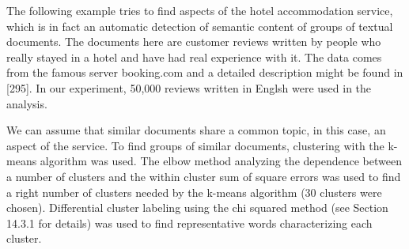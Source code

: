 \documentclass[11pt,openany,executivepaper]{book}
\begin{document}
The following example tries to find aspects of the hotel accommodation service, which is in fact an automatic detection of semantic content of groups of textual documents. The documents here are customer reviews written by people who really stayed in a hotel and have had real experience with it. The data comes from the famous server booking.com and a detailed description might be found in [295]. In our experiment, 50,000 reviews written in Englsh were used in the analysis.

We can assume that similar documents share a common topic, in this case,
an aspect of the service. To find groups of similar documents, clustering with the k-means algorithm was used. The elbow method analyzing the dependence between a number of clusters and the within cluster sum of square errors was used to find a right number of clusters needed by the k-means algorithm (30 clusters were chosen). Differential cluster labeling using the chi squared method (see Section 14.3.1 for details) was used to find representative words characterizing
each cluster.
\end{document}
